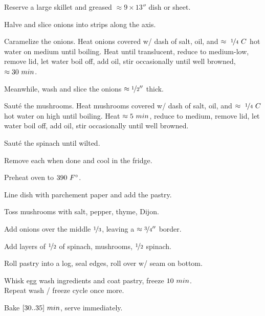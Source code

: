 \begin{preparation}
	\item Reserve a large skillet and greased $\approx9\times13''$ dish or sheet.
	\item Halve and slice onions into strips along the axis.
	\item Caramelize the onions.
		Heat onions covered w/ dash of salt, oil, and $\approx~\onefourth~C$ hot water on medium until boiling.
		Heat until translucent, reduce to medium-low, remove lid, let water boil off, add oil, stir occasionally until well browned, $\approx30~\minute$.
	\item Meanwhile, wash and slice the onions $\approx\onehalf''$ thick.
	\item Saut\'{e} the mushrooms.
		Heat mushrooms covered w/ dash of salt, oil, and $\approx~\onefourth~C$ hot water on high until boiling.
		Heat $\approx5~\minute$, reduce to medium, remove lid, let water boil off, add oil, stir occasionally until well browned.
	\item Saut\'{e} the spinach until wilted.
	\item Remove each when done and cool in the fridge.
	\item Preheat oven to $390~\Fahrenheit$.
	\item Line dish with parchement paper and add the pastry.
	\item Toss mushrooms with salt, pepper, thyme, Dijon.
	\item Add onions over the middle $\onethird$, leaving a $\approx\threefourth''$ border.
	\item Add layers of $\onehalf$ of spinach, mushrooms, $\onehalf$ spinach.
	\item Roll pastry into a log, seal edges, roll over w/ seam on bottom.
	\item Whisk egg wash ingredients and coat pastry, freeze $10~\minute$.\\
		Repeat wash / freeze cycle once more.
	\item Bake $[30..35]~\minute$, serve immediately.
\end{preparation}


\recipeend%
